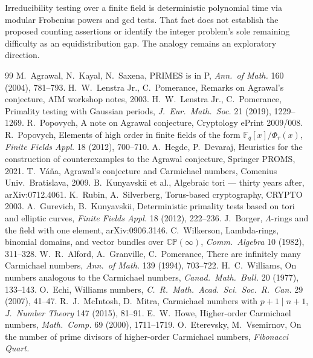 \documentclass[11pt]{article}
\theoremstyle{remark}
\newcommand{\F}{\mathbb{F}}
\begin{document}
Irreducibility testing over a finite field is deterministic polynomial time
via modular Frobenius powers and gcd tests. That fact does not establish
the proposed counting assertions or identify the integer problem's sole
remaining difficulty as an equidistribution gap. The analogy remains an
exploratory direction.


\begin{thebibliography}{99}
 M.~Agrawal, N.~Kayal, N.~Saxena, PRIMES is in P,
\emph{Ann.\ of Math.} 160 (2004), 781--793.
 H.~W.~Lenstra Jr., C.~Pomerance, Remarks on Agrawal's
conjecture, AIM workshop notes, 2003.
 H.~W.~Lenstra Jr., C.~Pomerance, Primality testing with
Gaussian periods, \emph{J.\ Eur.\ Math.\ Soc.} 21 (2019), 1229--1269.
 R.~Popovych, A note on Agrawal conjecture, Cryptology
ePrint 2009/008.
 R.~Popovych, Elements of high order in finite fields
of the form $\F_q[x]/\Phi_r(x)$, \emph{Finite Fields Appl.} 18 (2012),
700--710.
 A.~Hegde, P.~Devaraj, Heuristics for the construction
of counterexamples to the Agrawal conjecture, Springer PROMS, 2021.
 T.~V\'a\v{n}a, Agrawal's conjecture and Carmichael numbers,
Comenius Univ.\ Bratislava, 2009.
 B.~Kunyavskii et al., Algebraic tori --- thirty years after,
arXiv:0712.4061.
 K.~Rubin, A.~Silverberg, Torus-based cryptography, CRYPTO 2003.
 A.~Gurevich, B.~Kunyavskii, Deterministic primality tests
based on tori and elliptic curves, \emph{Finite Fields Appl.} 18 (2012),
222--236.
 J.~Borger, $\Lambda$-rings and the field with one element,
arXiv:0906.3146.
 C.~Wilkerson, Lambda-rings, binomial domains, and
vector bundles over $\mathbb{CP}(\infty)$, \emph{Comm.\ Algebra} 10
(1982), 311--328.
 W.~R.~Alford, A.~Granville, C.~Pomerance, There are
infinitely many Carmichael numbers, \emph{Ann.\ of Math.} 139 (1994),
703--722.
 H.~C.~Williams, On numbers analogous to the Carmichael
numbers, \emph{Canad.\ Math.\ Bull.} 20 (1977), 133--143.
 O.~Echi, Williams numbers, \emph{C.~R.\ Math.\ Acad.\ Sci.\
Soc.\ R.\ Can.} 29 (2007), 41--47.
 R.~J.~McIntosh, D.~Mitra, Carmichael numbers with
$p+1 \mid n+1$, \emph{J.\ Number Theory} 147 (2015), 81--91.
 E.~W.~Howe, Higher-order Carmichael numbers, \emph{Math.\
Comp.} 69 (2000), 1711--1719.
\bibitem{EterevskyVsemirnov} O.~Eterevsky, M.~Vsemirnov, On the number of
prime divisors of higher-order Carmichael numbers, \emph{Fibonacci Quart.}

\end{thebibliography}
\end{document}
